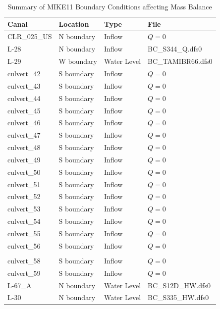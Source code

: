 \scriptsize
\begin{table}[!h]
\centering
\caption{Summary of MIKE11 Boundary Conditions affecting Mass Balance}
\label{tab:M11BCfiles}
\begin{tabular}{llll}
\hline
\textbf{Canal} & \textbf{Location} & \textbf{Type}   & \textbf{File}     \\
\hline
 CLR\_025\_US    & N boundary  & Inflow          & $Q=0$ \\
 L-28            & N boundary  & Inflow          & BC\_S344\_Q.dfs0 \\
 L-29            & W boundary  & Water Level     & BC\_TAMIBR66.dfs0 \\
culvert\_42      & S boundary  & Inflow          & $Q=0$ \\
culvert\_43      & S boundary  & Inflow          & $Q=0$ \\
culvert\_44      & S boundary  & Inflow          & $Q=0$ \\
culvert\_45      & S boundary  & Inflow          & $Q=0$ \\
culvert\_46      & S boundary  & Inflow          & $Q=0$ \\
culvert\_47      & S boundary  & Inflow          & $Q=0$ \\
culvert\_48      & S boundary  & Inflow          & $Q=0$ \\
culvert\_49      & S boundary  & Inflow          & $Q=0$ \\
culvert\_50      & S boundary  & Inflow          & $Q=0$ \\
culvert\_51      & S boundary  & Inflow          & $Q=0$ \\
culvert\_52      & S boundary  & Inflow          & $Q=0$ \\
culvert\_53      & S boundary  & Inflow          & $Q=0$ \\
culvert\_54      & S boundary  & Inflow          & $Q=0$ \\
culvert\_55      & S boundary  & Inflow          & $Q=0$ \\
culvert\_56      & S boundary  & Inflow          & $Q=0$ \\
\\
culvert\_58      & S boundary  & Inflow          & $Q=0$ \\
culvert\_59      & S boundary  & Inflow          & $Q=0$ \\
 L-67\_A        & N boundary  & Water Level     & BC\_S12D\_HW.dfs0 \\
 L-30           & N boundary  & Water Level     & BC\_S335\_HW.dfs0 \\

\end{tabular}
\end{table}
